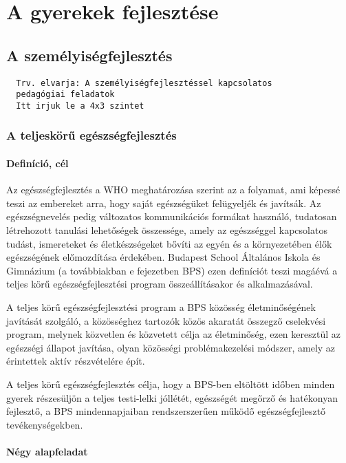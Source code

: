 \chapter{A gyerekek fejlesztése}
\section{A
személyiségfejlesztés}
\begin{verbatim}
  Trv. elvarja: A személyiségfejlesztéssel kapcsolatos
  pedagógiai feladatok
  Itt irjuk le a 4x3 szintet
\end{verbatim}


\subsection{A teljeskörű
egészségfejlesztés}\label{a-teljeskuxf6rux171-eguxe9szsuxe9gfejlesztuxe9s}

\subsubsection{Definíció, cél}\label{definuxedciuxf3-cuxe9l}

Az egészségfejlesztés a WHO meghatározása szerint az a folyamat, ami
képessé teszi az embereket arra, hogy saját egészségüket felügyeljék és
javítsák. Az egészségnevelés pedig változatos kommunikációs formákat
használó, tudatosan létrehozott tanulási lehetőségek összessége, amely
az egészséggel kapcsolatos tudást, ismereteket és életkészségeket bővíti
az egyén és a környezetében élők egészségének előmozdítása érdekében.
Budapest School Általános Iskola és Gimnázium (a továbbiakban e
fejezetben BPS) ezen definíciót teszi magáévá a teljes körű
egészségfejlesztési program összeállításakor és alkalmazásával.

A teljes körű egészségfejlesztési program a BPS közösség életminőségének
javítását szolgáló, a közösséghez tartozók közös akaratát összegző
cselekvési program, melynek közvetlen és közvetett célja az életminőség,
ezen keresztül az egészségi állapot javítása, olyan közösségi
problémakezelési módszer, amely az érintettek aktív részvételére épít.

A teljes körű egészségfejlesztés célja, hogy a BPS-ben eltöltött időben
minden gyerek részesüljön a teljes testi-lelki jóllétét, egészségét
megőrző és hatékonyan fejlesztő, a BPS mindennapjaiban rendszerszerűen
működő egészségfejlesztő tevékenységekben.

\subsubsection{Négy alapfeladat}\label{nuxe9gy-alapfeladat}

